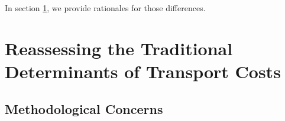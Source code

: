 \documentclass[a4paper,11pt]{article}
\begin{document}



In section \ref{sec:determinants}, we provide rationales for those differences.

\section{Reassessing the Traditional Determinants of Transport Costs}\label{sec:determinants}

\subsection{Methodological Concerns}



\end{document}
